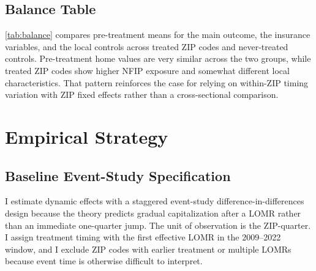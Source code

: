 \documentclass[12pt]{article}
\begin{document}

\FloatBarrier

\subsection{Balance Table}\label{sec:data_balance}

\autoref{tab:balance} compares pre-treatment means for the main outcome, the insurance variables, and the local controls across treated ZIP codes and never-treated controls. Pre-treatment home values are very similar across the two groups, while treated ZIP codes show higher NFIP exposure and somewhat different local characteristics. That pattern reinforces the case for relying on within-ZIP timing variation with ZIP fixed effects rather than a cross-sectional comparison.



\section{Empirical Strategy}\label{sec:strategy}

\subsection{Baseline Event-Study Specification}\label{sec:strategy_baseline}

I estimate dynamic effects with a staggered event-study difference-in-differences design because the theory predicts gradual capitalization after a LOMR rather than an immediate one-quarter jump. The unit of observation is the ZIP-quarter. I assign treatment timing with the first effective LOMR in the 2009--2022 window, and I exclude ZIP codes with earlier treatment or multiple LOMRs because event time is otherwise difficult to interpret.
\end{document}
